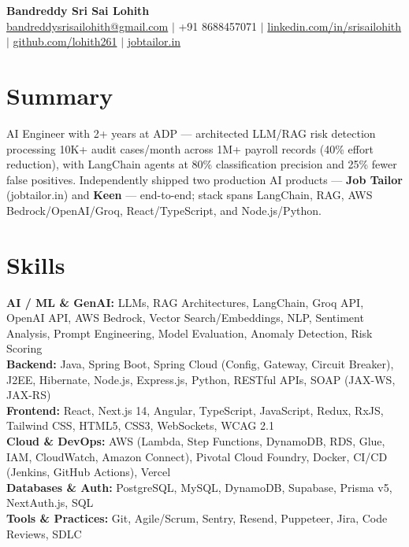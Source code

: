 \documentclass[10pt, letterpaper]{article}
\newcommand{\skillrow}[2]{%
  \textbf{#1:} #2 \\[1pt]%
}
\begin{document}
\begin{center}
  {\Huge\bfseries Bandreddy Sri Sai Lohith}\\[4pt]
  \small
  \href{mailto:bandreddysrisailohith@gmail.com}{bandreddysrisailohith@gmail.com}
  $\vert$\;
  +91 8688457071
  $\vert$\;
  \href{https://linkedin.com/in/srisailohith}{linkedin.com/in/srisailohith}
  $\vert$\;
  \href{https://github.com/lohith261}{github.com/lohith261}
  $\vert$\;
  \href{https://jobtailor.in}{jobtailor.in}
\end{center}

\section{Summary}

AI Engineer with 2+ years at ADP — architected LLM/RAG risk detection processing
10K+ audit cases/month across 1M+ payroll records (40\% effort reduction), with
LangChain agents at 80\% classification precision and 25\% fewer false positives.
Independently shipped two production AI products — \textbf{Job Tailor} (jobtailor.in)
and \textbf{Keen} — end-to-end; stack spans LangChain, RAG, AWS Bedrock/OpenAI/Groq,
React/TypeScript, and Node.js/Python.

\section{Skills}

\skillrow{AI / ML \& GenAI}{LLMs, RAG Architectures, LangChain, Groq API, OpenAI API, AWS Bedrock, Vector Search/Embeddings, NLP, Sentiment Analysis, Prompt Engineering, Model Evaluation, Anomaly Detection, Risk Scoring}
\skillrow{Backend}{Java, Spring Boot, Spring Cloud (Config, Gateway, Circuit Breaker), J2EE, Hibernate, Node.js, Express.js, Python, RESTful APIs, SOAP (JAX-WS, JAX-RS)}
\skillrow{Frontend}{React, Next.js 14, Angular, TypeScript, JavaScript, Redux, RxJS, Tailwind CSS, HTML5, CSS3, WebSockets, WCAG 2.1}
\skillrow{Cloud \& DevOps}{AWS (Lambda, Step Functions, DynamoDB, RDS, Glue, IAM, CloudWatch, Amazon Connect), Pivotal Cloud Foundry, Docker, CI/CD (Jenkins, GitHub Actions), Vercel}
\skillrow{Databases \& Auth}{PostgreSQL, MySQL, DynamoDB, Supabase, Prisma v5, NextAuth.js, SQL}
\skillrow{Tools \& Practices}{Git, Agile/Scrum, Sentry, Resend, Puppeteer, Jira, Code Reviews, SDLC}
\end{document}
